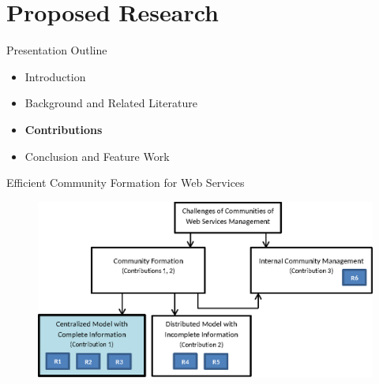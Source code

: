 \documentclass{beamer}
\begin{document}


\section{Proposed Research}
\begin{frame}{Presentation Outline}
    \begin{itemize}
     	\itemsep=.5cm
        \item Introduction
        \item Background and Related Literature
    	\item {\bf Contributions}
    	\item Conclusion and Feature Work
    \end{itemize}
\end{frame}


\begin{frame}{Efficient Community Formation for Web Services}
    \begin{figure}[htbp]
        \centering
        \includegraphics[width=0.9 \columnwidth]{figures/model_c1.eps}
    \end{figure}
\end{frame}
\end{document}
